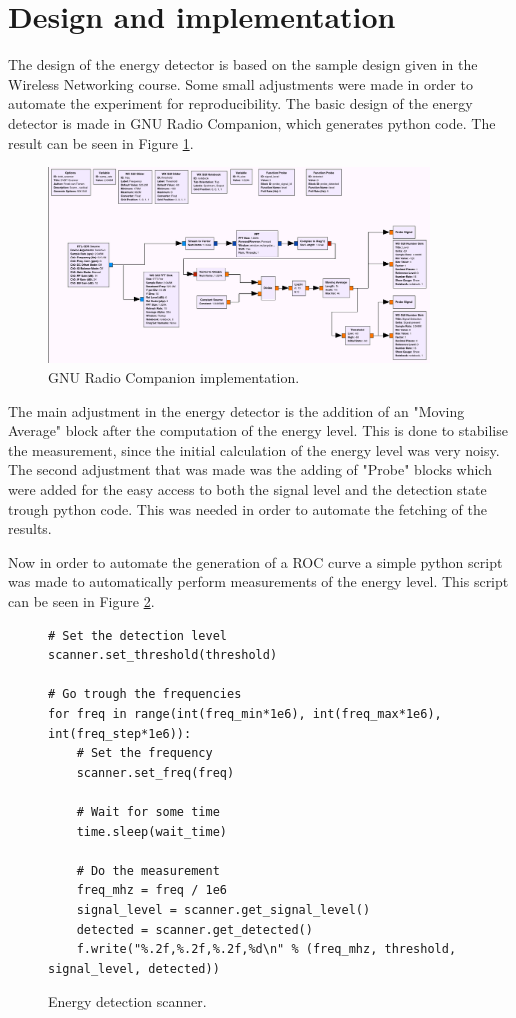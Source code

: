 \documentclass[]{article}
\begin{document}
\newpage
\section{Design and implementation}
The design of the energy detector is based on the sample design given in the Wireless Networking course.
Some small adjustments were made in order to automate the experiment for reproducibility.
The basic design of the energy detector is made in GNU Radio Companion, which generates python code.
The result can be seen in Figure \ref{fig:gnu_comp}.

\begin{figure}[H]
    \includegraphics[width=0.9\textwidth]{gnuradio_companion.png}
    \caption{GNU Radio Companion implementation.\label{fig:gnu_comp}}
\end{figure}

The main adjustment in the energy detector is the addition of an "Moving Average" block after the computation of the energy level. This is done to stabilise the measurement, since the initial calculation of the energy level was very noisy. The second adjustment that was made was the adding of "Probe" blocks which were added for the easy access to both the signal level and the detection state trough python code.
This was needed in order to automate the fetching of the results.

Now in order to automate the generation of a ROC curve a simple python script was made to automatically perform measurements of the energy level.
This script can be seen in Figure \ref{fig:energy_det}.

\begin{figure}[H]
\begin{lstlisting}[frame=bt]
# Set the detection level
scanner.set_threshold(threshold)

# Go trough the frequencies
for freq in range(int(freq_min*1e6), int(freq_max*1e6), int(freq_step*1e6)):
	# Set the frequency
	scanner.set_freq(freq)

	# Wait for some time
	time.sleep(wait_time)

	# Do the measurement
	freq_mhz = freq / 1e6
	signal_level = scanner.get_signal_level()
	detected = scanner.get_detected()
	f.write("%.2f,%.2f,%.2f,%d\n" % (freq_mhz, threshold, signal_level, detected))
\end{lstlisting}
\caption{Energy detection scanner.\label{fig:energy_det}}
\end{figure}
\end{document}
